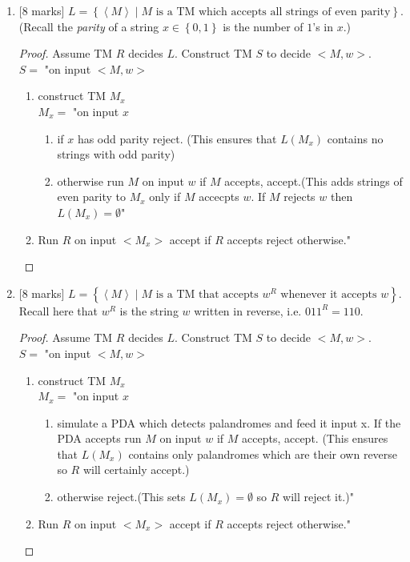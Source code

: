 \documentclass{article}
\newcommand{\set}[1]{{\left\{#1\right\}}}    %
\newcommand{\enc}[1]{\left<#1\right>}
\begin{document}
\begin{enumerate}
\begin{enumerate}
        \item {[8 marks]} $L=\set{\enc{M}\mid M\text{ is a TM which accepts all strings of even parity}}$. (Recall the \emph{parity} of a string $x\in\set{0,1}$ is the number of $1$'s in $x$.)
        \begin{proof}
        Assume TM $R$ decides $L$. Construct TM $S$ to decide $<M, w>$.\\
        $S =$ "on input $<M, w>$
        	\begin{enumerate}
        		\item construct TM $M_x$\\
        			$M_x =$ "on input $x$
        				\begin{enumerate}
        				\item if $x$ has odd parity reject. (This ensures that $L(M_x)$ contains no strings with odd parity)
        				\item otherwise run $M$ on input $w$ if $M$ accepts, accept.(This adds strings of even parity to $M_x$ only if $M$ accecpts $w$. If $M$ rejects $w$ then $L(M_x) = \emptyset$"
        				\end{enumerate}
        		\item Run $R$ on input $<M_x>$ accept if $R$ accepts reject otherwise."
        	\end{enumerate}
        \end{proof}
        \item {[8 marks]} $L=\set{\enc{M}\mid M\text{ is a TM that accepts }w^R\text{ whenever it accepts }w}$. Recall here that $w^R$ is the string $w$ written in reverse, i.e. $011^R=110$.
        \begin{proof}
        Assume TM $R$ decides $L$. Construct TM $S$ to decide $<M, w>$.\\
        $S =$ "on input $<M, w>$
        	\begin{enumerate}
        		\item construct TM $M_x$\\
        			$M_x =$ "on input $x$
        				\begin{enumerate}
        				\item simulate a PDA which detects palandromes and feed it input x. If the PDA accepts run $M$ on input $w$ if $M$ accepts, accept. (This ensures that $L(M_x)$ contains only palandromes which are their own reverse so $R$ will certainly accept.)
        				\item otherwise reject.(This sets $L(M_x) = \emptyset$ so $R$ will reject it.)"
        				\end{enumerate}
        		\item Run $R$ on input $<M_x>$ accept if $R$ accepts reject otherwise."
        	\end{enumerate}
        \end{proof}
        

\end{enumerate}
\end{enumerate}
\end{document}
